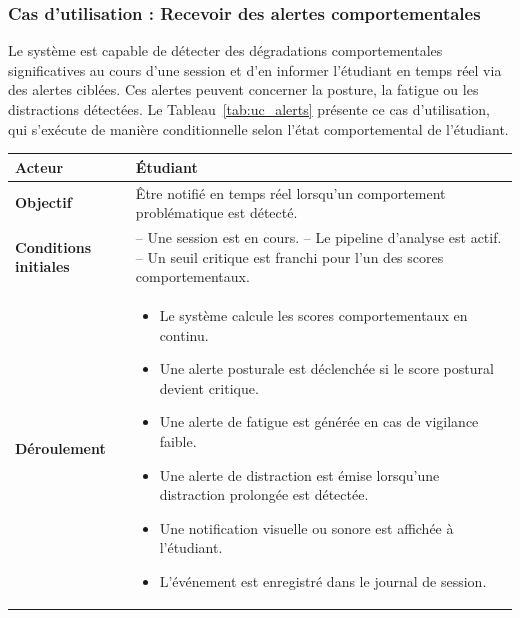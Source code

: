 \subsubsection{Cas d'utilisation : Recevoir des alertes comportementales}

Le système est capable de détecter des dégradations comportementales significatives au cours d'une session et d'en informer l'étudiant en temps réel via des alertes ciblées. Ces alertes peuvent concerner la posture, la fatigue ou les distractions détectées. Le Tableau~\ref{tab:uc_alerts} présente ce cas d'utilisation, qui s'exécute de manière conditionnelle selon l'état comportemental de l'étudiant.

\begin{table}[H]
\centering
\renewcommand{\arraystretch}{1.2}

\begin{tabular}{|>{\raggedright\arraybackslash}p{3.5cm}|>{\raggedright\arraybackslash}p{9.5cm}|}
\hline

\textbf{Acteur} & Étudiant \\ \hline

\textbf{Objectif} & 
Être notifié en temps réel lorsqu'un comportement problématique est détecté.
\\ \hline

\textbf{Conditions initiales} & 
-- Une session est en cours. \newline
-- Le pipeline d'analyse est actif. \newline
-- Un seuil critique est franchi pour l'un des scores comportementaux.
\\ \hline

\textbf{Déroulement} &
\begin{itemize} 
    \item Le système calcule les scores comportementaux en continu.
    \item Une alerte posturale est déclenchée si le score postural devient critique.
    \item Une alerte de fatigue est générée en cas de vigilance faible. 
    \item Une alerte de distraction est émise lorsqu'une distraction prolongée est détectée. 
    \item Une notification visuelle ou sonore est affichée à l'étudiant.
    \item L'événement est enregistré dans le journal de session.
\end{itemize} \\ \hline


\end{tabular}
\end{table}
